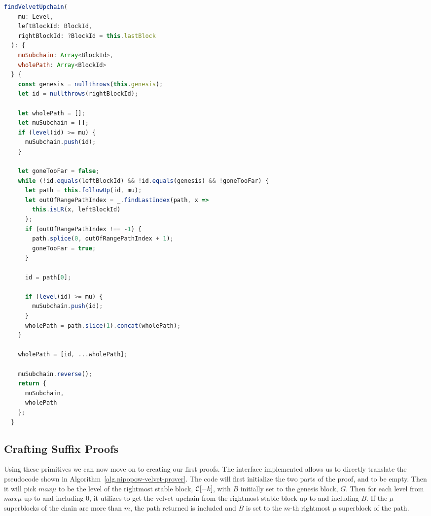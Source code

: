 \begin{lstlisting}[language=Javascript]
  findVelvetUpchain(
    mu: Level,
    leftBlockId: BlockId,
    rightBlockId: ?BlockId = this.lastBlock
  ): {
    muSubchain: Array<BlockId>,
    wholePath: Array<BlockId>
  } {
    const genesis = nullthrows(this.genesis);
    let id = nullthrows(rightBlockId);

    let wholePath = [];
    let muSubchain = [];
    if (level(id) >= mu) {
      muSubchain.push(id);
    }

    let goneTooFar = false;
    while (!id.equals(leftBlockId) && !id.equals(genesis) && !goneTooFar) {
      let path = this.followUp(id, mu);
      let outOfRangePathIndex = _.findLastIndex(path, x =>
        this.isLR(x, leftBlockId)
      );
      if (outOfRangePathIndex !== -1) {
        path.splice(0, outOfRangePathIndex + 1);
        goneTooFar = true;
      }

      id = path[0];

      if (level(id) >= mu) {
        muSubchain.push(id);
      }
      wholePath = path.slice(1).concat(wholePath);
    }

    wholePath = [id, ...wholePath];

    muSubchain.reverse();
    return {
      muSubchain,
      wholePath
    };
  }
\end{lstlisting}

\subsection{Crafting Suffix Proofs}
Using these primitives we can now move on to creating our first proofs. The interface implemented allows us to directly translate the pseudocode shown in Algorithm~\ref{alg.nipopow-velvet-prover}. The code will first initialize the two parts of the proof,  and  to be empty. Then it will pick $max\mu$ to be the level of the rightmost stable block, $\mathcal{C}[-k]$, with $B$ initially set to the genesis block, $G$. Then for each level from $max\mu$ up to and including 0, it utilizes  to get the velvet upchain from the rightmost stable block up to and including $B$. If the $\mu$ superblocks of the chain are more than $m$, the path returned is included and $B$ is set to the $m$-th rightmost $\mu$ superblock of the path.

